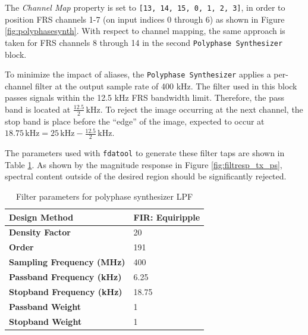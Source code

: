 The \textit{Channel Map} property is set to \texttt{[13, 14, 15, 0, 1, 2, 3]},
in order to position \ac{FRS} channels 1-7 (on input indices 0 through 6)
as shown in Figure \ref{fig:polyphasesynth}. With respect to channel mapping,
the same approach is taken for \ac{FRS} channels 8 through 14 in the second
\texttt{Polyphase Synthesizer} block.

To minimize the impact of aliases, the \texttt{Polyphase Synthesizer} applies
a per-channel filter at the output sample rate of 400 kHz. The filter used in
this block passes signals within the 12.5 kHz \ac{FRS} bandwidth limit.
Therefore, the pass band is located at $\frac{12.5}{2} \, \text{kHz}$.
To reject the image occurring at the next channel, the stop band is place before
the ``edge'' of the image, expected to occur at $18.75 \,\text{kHz} = 25
\,\text{kHz} - \frac{12.5}{2} \,\text{kHz}$.

The parameters used with \texttt{fdatool} to generate these
filter taps are shown in Table \ref{tab:tx_polysynth}. As shown by the magnitude
response in Figure \ref{fig:filtresp_tx_ps}, spectral content outside of the
desired region should be significantly rejected.

\begin{table}[h]
  \centering
  \caption{Filter parameters for polyphase synthesizer LPF}
  \label{tab:tx_polysynth}
  \footnotesize
  \begin{tabular} {|l|l|}
    \hline
    \textbf{Design Method}              & FIR: Equiripple \\ \hline
    \textbf{Density Factor}             & 20              \\ \hline
    \textbf{Order}                      & 191             \\ \hline
    \textbf{Sampling Frequency (MHz)}   & 400             \\ \hline
    \textbf{Passband Frequency (kHz)}   & 6.25            \\ \hline
    \textbf{Stopband Frequency (kHz)}   & 18.75           \\ \hline
    \textbf{Passband Weight}            & 1               \\ \hline
    \textbf{Stopband Weight}            & 1               \\ \hline
  \end{tabular}
\end{table}

